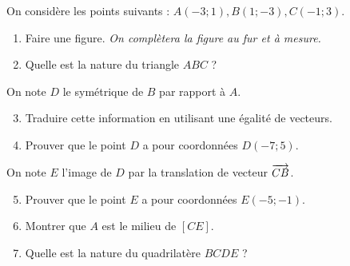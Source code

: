 \documentclass[11pt]{article}
\begin{document}
\begin{exo}
  On considère les points suivants : $A(-3; 1), B(1; -3), C(-1; 3)$.
  \begin{enumerate}
    \item Faire une figure. \emph{On complètera la figure au fur et à mesure.}
    \item Quelle est la nature du triangle $ABC$ ?
  \end{enumerate}
  On note $D$ le symétrique de $B$ par rapport à $A$.
  \begin{enumerate}
      \setcounter{enumi}{2}
    \item Traduire cette information en utilisant une égalité de vecteurs.
    \item Prouver que le point $D$ a pour coordonnées $D(-7; 5)$.
  \end{enumerate}
  On note $E$ l'image de $D$ par la translation de vecteur $\overrightarrow{CB}$.
  \begin{enumerate}
      \setcounter{enumi}{4}
    \item Prouver que le point $E$ a pour coordonnées $E(-5; -1)$.
    \item Montrer que $A$ est le milieu de $\left[ CE \right]$.
    \item Quelle est la nature du quadrilatère $BCDE$ ?
  \end{enumerate}
\end{exo}
\end{document}
